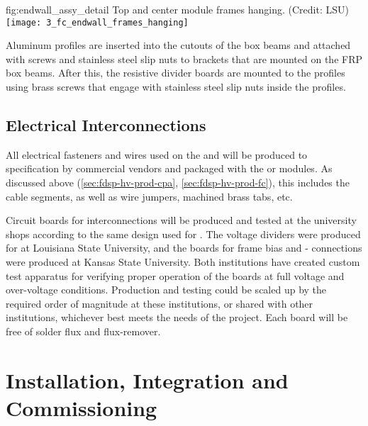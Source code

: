 \begin{dunefigure}{fig:endwall_assy_detail}{%
Top and center  module frames hanging. (Credit: LSU)}
\texttt{[image: 3\_fc\_endwall\_frames\_hanging]}
\end{dunefigure}


Aluminum profiles are inserted into the cutouts of the box beams and attached with screws and stainless steel slip nuts to brackets that are mounted on the 
FRP box beams. After this, the resistive divider boards are mounted to the profiles using brass screws that engage with stainless steel slip nuts inside 
the profiles.

\subsection{Electrical Interconnections}
\label{sec:fdsp-hv-prod-interconnect}

All electrical fasteners and wires used on the  and  will be produced
to specification by commercial vendors and packaged with the  or  modules.  
As discussed above (\ref{sec:fdsp-hv-prod-cpa}, \ref{sec:fdsp-hv-prod-fc}), 
this includes the  cable segments, as well as wire jumpers, machined brass
tabs, etc.

Circuit boards for %
 interconnections will be produced and tested at the  university shops according to the same design used for .  The  voltage dividers were produced for  at Louisiana State University, and the boards for  frame bias and - connections were produced at Kansas State University.
Both institutions have created custom test apparatus for verifying proper operation of the boards at full voltage and over-voltage conditions.  Production and testing could be scaled up by the required order of magnitude at these institutions, or shared with other institutions, whichever best meets the needs of the project. Each board will be free of solder flux and flux-remover. 
 
\section{Installation, Integration and Commissioning}
\label{sec:fdsp-hv-install}

